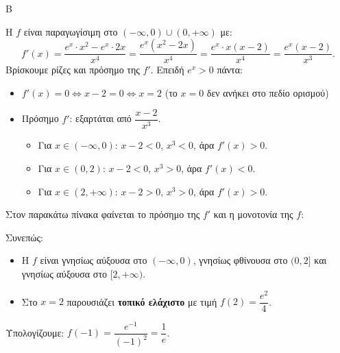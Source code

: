 \begin{thema}{Β}
\begin{erwthma}
\item Η $f$ είναι παραγωγίσιμη στο $(-\infty,0)\cup(0,+\infty)$ με:
\[
f'(x) = \frac{e^x \cdot x^2 - e^x \cdot 2x}{x^4} = \frac{e^x(x^2 - 2x)}{x^4} = \frac{e^x \cdot x(x-2)}{x^4} = \frac{e^x(x-2)}{x^3}.
\]
Βρίσκουμε ρίζες και πρόσημο της $f'$. Επειδή $e^x > 0$ πάντα:
\begin{itemize}
    \item $f'(x) = 0 \Leftrightarrow x - 2 = 0 \Leftrightarrow x = 2$ \quad (το $x=0$ δεν ανήκει στο πεδίο ορισμού)
    \item Πρόσημο $f'$: εξαρτάται από $\dfrac{x-2}{x^3}$.
    \begin{itemize}
        \item Για $x \in (-\infty, 0)$: $x-2 < 0$, $x^3 < 0$, άρα $f'(x) > 0$.
        \item Για $x \in (0, 2)$: $x-2 < 0$, $x^3 > 0$, άρα $f'(x) < 0$.
        \item Για $x \in (2, +\infty)$: $x-2 > 0$, $x^3 > 0$, άρα $f'(x) > 0$.
    \end{itemize}
\end{itemize}
Στον παρακάτω πίνακα φαίνεται το πρόσημο της $f'$ και η μονοτονία της $f$:
\begin{center}
\end{center}
Συνεπώς:
\begin{itemize}
    \item Η $f$ είναι γνησίως αύξουσα στο $(-\infty, 0)$, γνησίως φθίνουσα στο $(0, 2]$ και γνησίως αύξουσα στο $[2, +\infty)$.
    \item Στο $x = 2$ παρουσιάζει \textbf{τοπικό ελάχιστο} με τιμή $f(2) = \dfrac{e^2}{4}$.
\end{itemize}

\item Υπολογίζουμε: $f(-1) = \dfrac{e^{-1}}{(-1)^2} = \dfrac{1}{e}$.


\end{erwthma}
\end{thema}
